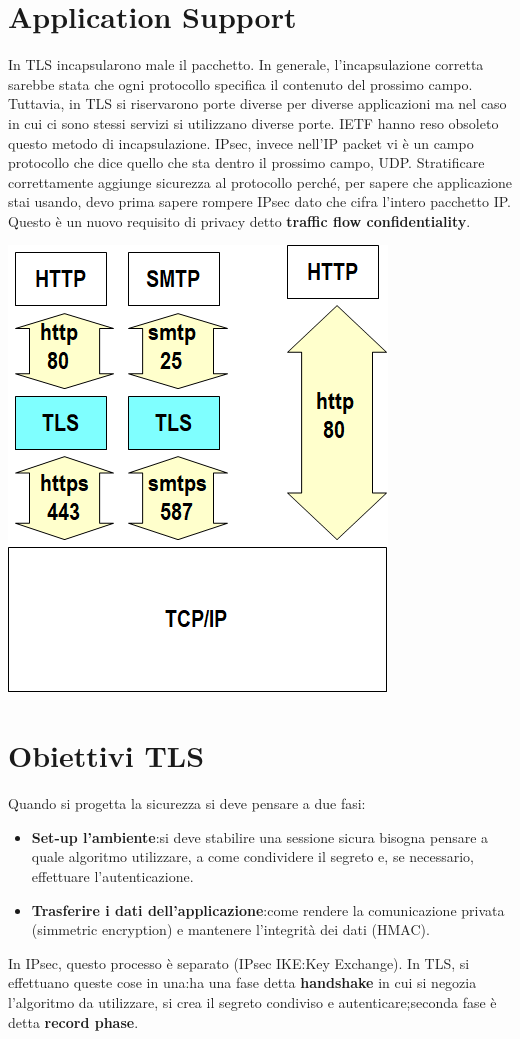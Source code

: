 \documentclass{book}
\theoremstyle{remark}
\begin{document}
\section{Application Support}
In TLS incapsularono male il pacchetto\@. In generale, l'incapsulazione corretta sarebbe stata che ogni protocollo specifica il contenuto del prossimo campo\@. Tuttavia, in TLS si riservarono porte diverse per diverse applicazioni ma nel caso in cui ci sono stessi servizi si utilizzano diverse porte\@. IETF hanno reso obsoleto questo metodo di incapsulazione\@.
IPsec, invece nell'IP packet vi è un campo protocollo che dice quello che sta dentro il prossimo campo, UDP\@.\newline
Stratificare correttamente aggiunge sicurezza al protocollo perché, per sapere che applicazione stai usando, devo prima sapere rompere IPsec dato che cifra l'intero pacchetto IP\@. Questo è un nuovo requisito di privacy detto \textbf{traffic flow confidentiality}\@.
\begin{center}
	\includegraphics[scale=0.5]{TLSAPP.png}
\end{center}
\section{Obiettivi TLS}
Quando si progetta la sicurezza si deve pensare a due fasi:\begin{itemize}
	\item \textbf{Set-up l'ambiente}:\@quando si deve stabilire una sessione sicura bisogna pensare a quale algoritmo utilizzare, a come condividere il segreto e, se necessario, effettuare l'autenticazione\@.
	\item \textbf{Trasferire i dati dell'applicazione}:\@decidere come rendere la comunicazione privata (simmetric encryption) e mantenere l'integrità dei dati (HMAC)\@.
\end{itemize}
In IPsec, questo processo è separato (IPsec IKE:\@Internet Key Exchange)\@. In TLS, si effettuano queste cose in una:\@si ha una fase detta \textbf{handshake} in cui si negozia l'algoritmo da utilizzare, si crea il segreto condiviso e autenticare;\@la seconda fase è detta \textbf{record phase}\@.
\end{document}
